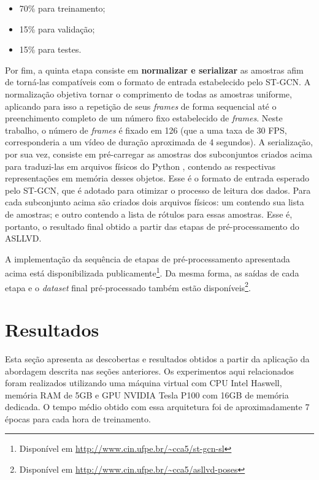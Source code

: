 \begin{itemize}
    \item 70\% para treinamento;
    \item 15\% para validação;
    \item 15\% para testes.
\end{itemize}

Por fim, a quinta etapa consiste em \textbf{normalizar e serializar} as amostras afim de torná-las compatíveis com o formato de entrada estabelecido pelo ST-GCN. A normalização objetiva tornar o comprimento de todas as amostras uniforme, aplicando para isso a repetição de seus \textit{frames} de forma sequencial até o preenchimento completo de um número fixo estabelecido de \textit{frames}. Neste trabalho, o número de \textit{frames} é fixado em 126 (que a uma taxa de 30 FPS, corresponderia a um vídeo de duração aproximada de 4 segundos). A serialização, por sua vez, consiste em pré-carregar as amostras dos subconjuntos criados acima para traduzi-las em arquivos físicos do Python \cite{python}, contendo as respectivas representações em memória desses objetos. Esse é o formato de entrada esperado pelo ST-GCN, que é adotado para otimizar o processo de leitura dos dados. Para cada subconjunto acima são criados dois arquivos físicos: um contendo sua lista de amostras; e outro contendo a lista de rótulos para essas amostras. Esse é, portanto, o resultado final obtido a partir das etapas de pré-processamento do ASLLVD.

A implementação da sequência de etapas de pré-processamento apresentada acima está disponibilizada publicamente\footnote{
    Disponível em \url{http://www.cin.ufpe.br/~cca5/st-gcn-sl}
}. Da mesma forma, as saídas de cada etapa e o \textit{dataset} final pré-processado também estão disponíveis\footnote{
    Disponível em \url{http://www.cin.ufpe.br/~cca5/asllvd-poses}
}.



\section{Resultados} %
\label{sec:resultados}

Esta seção apresenta as descobertas e resultados obtidos a partir da aplicação da abordagem descrita nas seções anteriores. Os experimentos aqui relacionados foram realizados utilizando uma máquina virtual com CPU Intel Haswell, memória RAM de 5GB e GPU NVIDIA Tesla P100 com 16GB de memória dedicada. O tempo médio obtido com essa arquitetura foi de aproximadamente 7 épocas para cada hora de treinamento.

